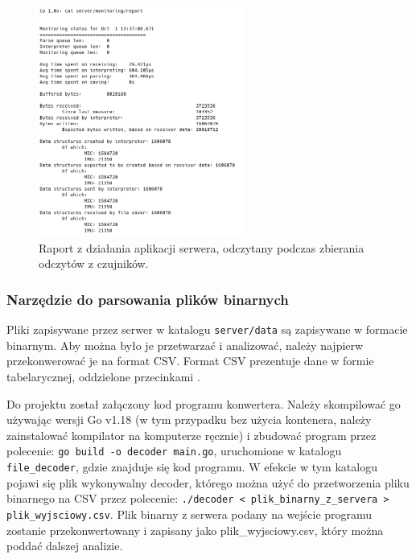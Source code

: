 \documentclass[12pt,oneside,a4paper]{book}
\theoremstyle{break}
\begin{document}
\begin{figure}[H]
    \begin{center}
        \includegraphics[width=0.6\textwidth]{monitoring_report.png}
        \caption{Raport z działania aplikacji serwera, odczytany podczas zbierania odczytów z czujników.}
        \label{figure:example-monitoring}
    \end{center}
\end{figure}

\subsubsection{Narzędzie do parsowania plików binarnych}\label{file-parsing-chapter}
Pliki zapisywane przez serwer w katalogu \texttt{server/data} są zapisywane w
formacie binarnym. Aby można było je przetwarzać i analizować, należy najpierw
przekonwerować je na format CSV. Format CSV prezentuje dane w formie tabelarycznej, 
oddzielone przecinkami \cite{csv-definition}. 
\par Do projektu został załączony kod programu konwertera. Należy skompilować go 
używając wersji Go v1.18 (w tym przypadku bez użycia kontenera, należy zainstalować
kompilator na komputerze ręcznie\cite{go-install}) i zbudować program przez polecenie:
\texttt{go build -o decoder main.go}, uruchomione w katalogu \texttt{file\_decoder}, 
gdzie znajduje się kod programu. W efekcie w tym katalogu pojawi się plik wykonywalny
decoder, którego można użyć do przetworzenia pliku binarnego na CSV przez polecenie:
\texttt{./decoder < plik\_binarny\_z\_servera > plik\_wyjsciowy.csv}. Plik binarny z serwera
podany na wejście programu zostanie przekonwertowany i zapisany jako plik\_wyjsciowy.csv, 
który można poddać dalszej analizie.
\end{document}
